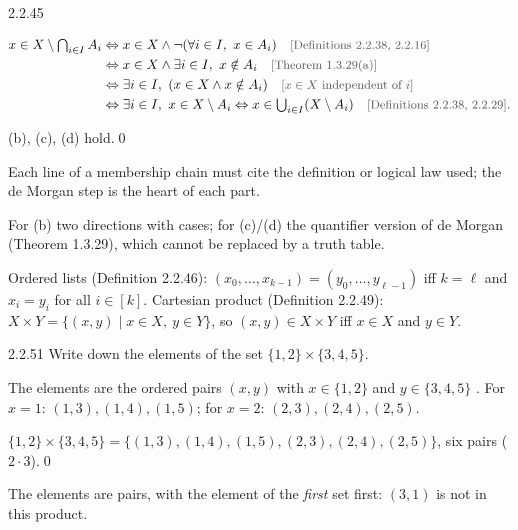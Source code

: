 \begin{bookex}[recommended]{2.2.45}
\begin{steps}
\begin{align*}
x\in X\setminus\textstyle\bigcap_{i\in I}A_i&\Leftrightarrow x\in X\wedge\neg(\forall i\in I,\ x\in A_i)\why{Definitions 2.2.38, 2.2.16}\\
&\Leftrightarrow x\in X\wedge\exists i\in I,\ x\notin A_i\why{Theorem 1.3.29(a)}\\
&\Leftrightarrow\exists i\in I,\ (x\in X\wedge x\notin A_i)\why{$x\in X$ independent of $i$}\\
&\Leftrightarrow\exists i\in I,\ x\in X\setminus A_i\Leftrightarrow x\in\textstyle\bigcup_{i\in I}(X\setminus A_i)\why{Definitions 2.2.38, 2.2.29}.
\end{align*}
\end{steps}
\conclusion (b), (c), (d) hold.\qed
\begin{compare}
\item Each line of a membership chain must cite the definition or logical law used; the de Morgan step is the heart of each part.
\item For (b) two directions with cases; for (c)/(d) the quantifier version of de Morgan (Theorem 1.3.29), which cannot be replaced by a truth table.
\end{compare}
\end{bookex}


\begin{key}
Ordered lists (Definition 2.2.46): $(x_0,\dots,x_{k-1})=(y_0,\dots,y_{\ell-1})$ iff $k=\ell$ and $x_i=y_i$ for all $i\in[k]$. Cartesian product (Definition 2.2.49): $X\times Y=\{(x,y)\mid x\in X,\ y\in Y\}$, so $(x,y)\in X\times Y$ iff $x\in X$ and $y\in Y$.
\end{key}

\begin{bookex}[essential]{2.2.51}
Write down the elements of the set $\{1,2\}\times\{3,4,5\}$.
\solution
\begin{steps}
\item The elements are the ordered pairs $(x,y)$ with $x\in\{1,2\}$ and $y\in\{3,4,5\}$ . For $x=1$: $(1,3),(1,4),(1,5)$; for $x=2$: $(2,3),(2,4),(2,5)$.
\end{steps}
\answer $\{1,2\}\times\{3,4,5\}=\{(1,3),(1,4),(1,5),(2,3),(2,4),(2,5)\}$, six pairs ($2\cdot3$).\qed
\begin{compare}
\item The elements are pairs, with the element of the \emph{first} set first: $(3,1)$ is not in this product.
\end{compare}
\end{bookex}


